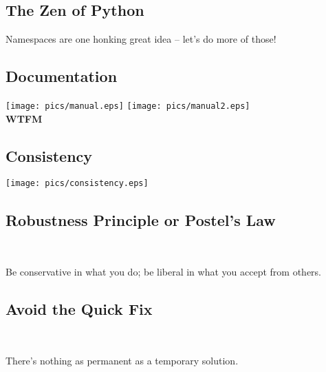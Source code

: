 \documentclass[xga]{xdvislides}
\begin{document}
\subsection{The Zen of Python}
\begin{center}
    Namespaces are one honking great idea -- let's do more of those!
\end{center}
\Normalsize

\subsection{Documentation}
\vspace*{\fill}
\begin{center}
	\texttt{[image: pics/manual.eps]}
	\hspace{.5in}
	\texttt{[image: pics/manual2.eps]}
	\\
	\vspace{.2in}
	\Huge
	{\bf WTFM}
	\Normalsize
\end{center}
\vspace*{\fill}


\subsection{Consistency}
\vspace*{\fill}
\begin{center}
	\texttt{[image: pics/consistency.eps]}
\end{center}
\vspace*{\fill}

\subsection{Robustness Principle or Postel's Law}
\\
\Huge
\begin{center}
	Be conservative in what you do; be liberal in what you accept from others.
\end{center}
\Normalsize

\subsection{Avoid the Quick Fix}
\\
\Huge
\begin{center}
	There's nothing as permanent as a temporary solution.
\end{center}
\Normalsize
\end{document}
